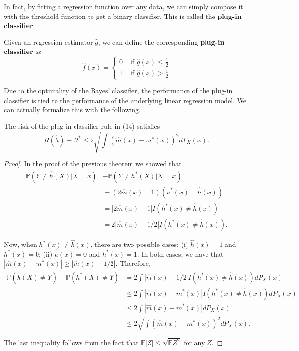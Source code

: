 In fact, by fitting a regression function over any data, we can simply compose it with the threshold function to get a binary classifier. This is called the \textbf{plug-in classifier}. 

\begin{definition}
  Given an regression estimator $\hat{g}$, we can define the corresponding \textbf{plug-in classifier} as 
  \begin{equation}
    \hat{f}(x) = \begin{cases} 
      0 & \text{ if } \hat{g}(x) \leq \frac{1}{2} \\ 
      1 & \text{ if } \hat{g}(x) > \frac{1}{2} 
    \end{cases}
  \end{equation}
\end{definition}

Due to the optimality of the Bayes' classifier, the performance of the plug-in classifier is tied to the performance of the underlying linear regression model. We can actually formalize this with the following. 

\begin{theorem}
  The risk of the plug-in classifier rule in (14) satisfies
  \begin{equation}
    R(\hat{h}) - R^\ast \leq 2\sqrt{\int (\hat{m}(x) - m^\ast(x))^2 dP_X(x)}.
  \end{equation}
\end{theorem}
\begin{proof}
  In the proof of \href{thm:bayes_optimality}{the previous theorem} we showed that
  \begin{align}
    \mathbb{P}(Y \neq \hat{h}(X)|X = x) 
    & - \mathbb{P}(Y \neq h^{\ast}(X)|X = x) \\ 
    & = (2\hat{m}(x) - 1)(h^{\ast}(x) - \hat{h}(x)) \\
    & = |2\hat{m}(x) - 1|I(h^{\ast}(x) \neq \hat{h}(x)) \\ 
    & = 2|\hat{m}(x) - 1/2|I(h^{\ast}(x) \neq \hat{h}(x)).
  \end{align}
  
  Now, when $h^{\ast}(x) \neq \hat{h}(x)$, there are two possible cases: (i) $\hat{h}(x) = 1$ and $h^{\ast}(x) = 0$; (ii) $\hat{h}(x) = 0$ and $h^{\ast}(x) = 1$. In both cases, we have that $|\hat{m}(x) - m^{\ast}(x)| \geq |\hat{m}(x) - 1/2|$. Therefore,
  \begin{align}
    \mathbb{P}(\hat{h}(X) \neq Y) - \mathbb{P}(h^{\ast}(X) \neq Y) &= 2\int |\hat{m}(x) - 1/2|I(h^{\ast}(x) \neq \hat{h}(x))dP_X(x) \\
    &\leq 2\int |\hat{m}(x) - m^{\ast}(x)|I(h^{\ast}(x) \neq \hat{h}(x))dP_X(x) \\
    &\leq 2\int |\hat{m}(x) - m^{\ast}(x)|dP_X(x) \tag{15} \\
    &\leq 2\sqrt{\int (\hat{m}(x) - m^{\ast}(x))^2 dP_X(x)}. \tag{16}
  \end{align}
  
  The last inequality follows from the fact that $\mathbb{E}|Z| \leq \sqrt{\mathbb{E}Z^2}$ for any $Z$.
\end{proof}
